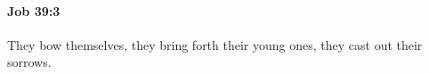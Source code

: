 
		\paragraph{Job 39:3} %
			\label{JOB-39-3}

			They bow themselves, they bring forth their young ones, they cast out their sorrows.


